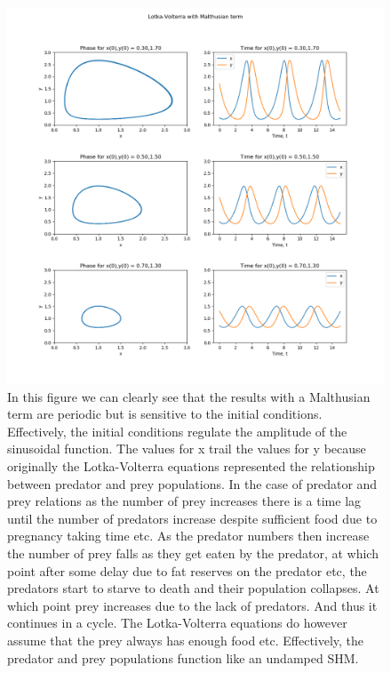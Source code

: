 \documentclass[11pt,a4paper]{CLabBookTemplate} %
\begin{document}
\begin{figure}[h!]
	\centering
	\includegraphics[width = 160mm]{Figures/Task3LV.png}
	\caption{In this figure we can clearly see that the results with a Malthusian term are periodic but is sensitive to the initial conditions. Effectively, the initial conditions regulate the amplitude of the sinusoidal function. The values for x trail the values for y because originally the Lotka-Volterra equations represented the relationship between predator and prey populations. In the case of predator and prey relations as the number of prey increases there is a time lag until the number of predators increase despite sufficient food due to pregnancy taking time etc. As the predator numbers then increase the number of prey falls as they get eaten by the predator, at which point after some delay due to fat reserves on the predator etc, the predators start to starve to death and their population collapses. At which point prey increases due to the lack of predators. And thus it continues in a cycle. The Lotka-Volterra equations do however assume that the prey always has enough food etc. Effectively, the predator and prey populations function like an undamped SHM.}
	\label{fig:Task3LV}
\end{figure}
\end{document}
